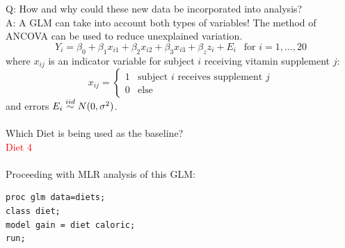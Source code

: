 Q: How and why could these new data be incorporated into analysis? \\
A: A GLM can take into account both types of variables!  The method of ANCOVA can be used to reduce unexplained variation. \\
$$ Y_i = \beta_0 + \beta_1 x_{i1} + \beta_2 x_{i2} + \beta_3 x_{i3} + \beta_z z_i + E_i \ \ \mbox{ for }i=1,\ldots,20$$
where $x_{ij}$ is an indicator variable for subject $i$ receiving vitamin supplement $j$:
$$ x_{ij}=\begin{cases} 1 & \text{subject $i$ receives supplement $j$} \\  
0 & \text{else} \end{cases}$$
and errors $E_i \stackrel{iid}{\sim} N(0,\sigma^2)$.\\~\\
Which Diet is being used as the baseline?\\
\textcolor{red}{Diet 4}\\~\\

Proceeding with MLR analysis of this GLM:

\begin{small}
\begin{verbatim}
proc glm data=diets;
class diet;
model gain = diet caloric;
run;
\end{verbatim}
\end{small}


